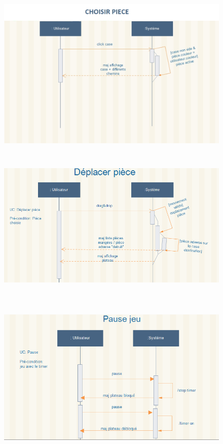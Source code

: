 \begin{figure}[ht]
\begin{center}
  \includegraphics[width = 35em, height=20em]{images/seq/choisir_piece.png}
\end{center}
\end{figure}

\begin{figure}[ht]
\begin{center}
  \includegraphics[width = 35em, height=20em]{images/seq/deplacer_piece.png}
\end{center}
\end{figure}

\begin{figure}[ht]
\begin{center}
  \includegraphics[width = 35em, height=20em]{images/seq/pause.png}
\end{center}
\end{figure}

